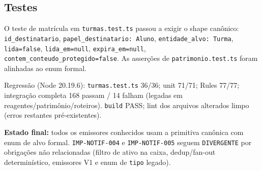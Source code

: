 \subsection{Testes}

O teste de matrícula em \texttt{turmas.test.ts} passou a exigir o shape
canônico: \texttt{id\_destinatario}, \texttt{papel\_destinatario: Aluno},
\texttt{entidade\_alvo: Turma}, \texttt{lida=false}, \texttt{lida\_em=null},
\texttt{expira\_em=null}, \texttt{contem\_conteudo\_protegido=false}. As
asserções de \texttt{patrimonio.test.ts} foram alinhadas ao enum formal.

Regressão (Node 20.19.6): \texttt{turmas.test.ts} 36/36; unit 71/71; Rules
77/77; integração completa 168 passam / 14 falham (legadas em
reagentes/patrimônio/roteiros). \texttt{build} PASS; lint dos arquivos
alterados limpo (erros restantes pré-existentes).

\textbf{Estado final:} todos os emissores conhecidos usam a primitiva canônica
com enum de alvo formal. \texttt{IMP-NOTIF-004} e \texttt{IMP-NOTIF-005}
seguem \texttt{DIVERGENTE} por obrigações não relacionadas (filtro de ativo na
caixa, dedup/fan-out determinístico, emissores V1 e enum de \texttt{tipo}
legado).

